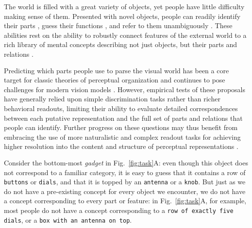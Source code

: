 \documentclass[10pt,letterpaper]{article}
\newcommand{\jda}[1]{{\color{blue}[jda: #1]}}
\begin{document}

The world is filled with a great variety of objects, yet people have little difficulty making sense of them. 
Presented with novel objects, people can readily identify their parts \cite{palmer1977hierarchical,marr1978representation, hoffman1984parts, hummel1992dynamic}, guess their functions , and refer to them unambiguously \cite{hawkins2020characterizing}. 
These abilities rest on the ability to robustly connect features of the external world to a rich library of mental concepts describing not just objects, but their parts and relations . 

Predicting which parts people use to parse the visual world has been a core target for classic theories of perceptual organization  and continues to pose challenges for modern vision models .
However, empirical tests of these proposals have generally relied upon simple discrimination tasks rather than richer behavioral readouts, limiting their ability to evaluate detailed correspondences between each putative representation and the full set of parts and relations that people can identify.
Further progress on these questions may thus benefit from embracing the use of more naturalistic and complex readout tasks for achieving higher resolution into the content and structure of perceptual representations . 


Consider the bottom-most \emph{gadget} in Fig.~\ref{fig:task}A: even though this object does not correspond to a familiar category, it is easy to guess that it contains a row of \texttt{buttons} or \texttt{dials}, and that it is topped by an \texttt{antenna} or a \texttt{knob}.
But just as we do not have a pre-existing concept for every object we encounter, we do not have a concept corresponding to every part or feature: in Fig.~\ref{fig:task}A, for example, most people do not have a concept corresponding to a \texttt{row of exactly five dials}, or a \texttt{box with an antenna on top}. 
\end{document}
